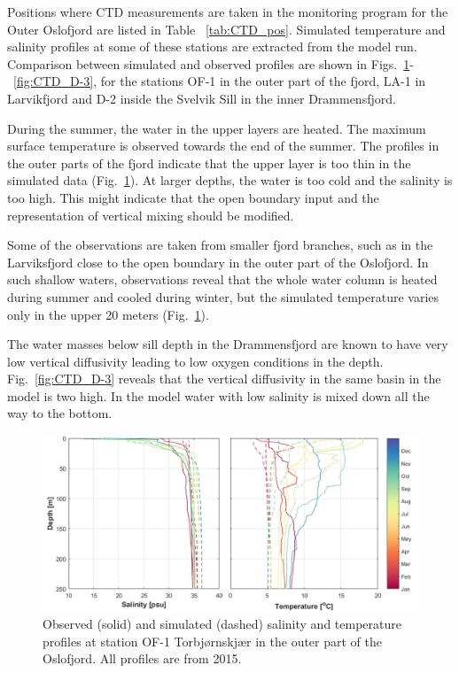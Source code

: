 Positions where CTD measurements are taken in the monitoring program for the Outer Oslofjord are listed in Table ~\ref{tab:CTD_pos}. 
Simulated temperature and salinity profiles at some of these stations are extracted from the model run. 
Comparison between simulated and observed profiles are shown in Figs.~\ref{fig:CTD_OF-1}-~\ref{fig:CTD_D-3}, for the stations OF-1 in the outer part of the fjord, LA-1 in Larvikfjord and D-2 inside the Svelvik Sill in the inner Drammensfjord. 

During the summer, the water in the upper layers are heated. 
The maximum surface temperature is observed towards the end of the summer. 
The profiles in the outer parts of the fjord indicate that the upper layer is too thin in the simulated data (Fig.~\ref{fig:CTD_OF-1}). 
At larger depths, the water is too cold and the salinity is too high. 
This might indicate that the open boundary input and the representation of vertical mixing should be modified. 

Some of the observations are taken from smaller fjord branches, such as in the Larviksfjord close to the open boundary in the outer part of the Oslofjord. 
In such shallow waters, observations reveal that the whole water column is heated during summer and cooled during winter, but the simulated temperature varies only in the upper 20 meters (Fig.~\ref{fig:CTD_OF-1}). 

The water masses below sill depth in the Drammensfjord are known to have very low vertical diffusivity leading to low oxygen conditions in the depth.
Fig.~\ref{fig:CTD_D-3} reveals that the vertical diffusivity in the same basin in the model is two high.
In the model water with low salinity is mixed down all the way to the bottom. 


\begin{figure}[tbh]
\centerline{
\includegraphics*[trim=0cm 0cm 0cm 0cm,clip=true,width=\textwidth]{Figurer/CTD_OF-1}}
\caption{\small
Observed (solid) and simulated (dashed) salinity and temperature profiles at station OF-1 Torbj{\o}rnskj{\ae}r in the outer part of the Oslofjord. All profiles are from 2015.}
\label{fig:CTD_OF-1}
\end{figure}

